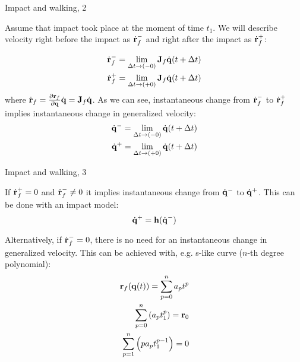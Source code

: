 \documentclass{beamer}
\begin{document}
\begin{frame}{Impact and walking, 2}
	\begin{flushleft}
		
		Assume that impact took place at the moment of time $t_1$. We will describe velocity right before the impact as $\dot{\mathbf{r}}_f^-$ and right after the impact as $\dot{\mathbf{r}}_f^+$:
		
		\begin{align}
			\dot{\mathbf{r}}_f^- = \lim_{\Delta t \to (-0)} \mathbf{J}_f \dot{\mathbf{q}}(t+\Delta t)
			\\
			\dot{\mathbf{r}}_f^+ = \lim_{\Delta t \to (+0)} \mathbf{J}_f \dot{\mathbf{q}}(t+\Delta t)
		\end{align}
		where $\dot{\mathbf{r}}_f  = \frac{\partial \mathbf{r}_f}{\partial \mathbf{q}} \dot{\mathbf{q}} = \mathbf{J}_f\dot{\mathbf{q}}$. As we can see, instantaneous change from $\dot{\mathbf{r}}_f^-$ to $\dot{\mathbf{r}}_f^+$ implies instantaneous change in generalized velocity:
		\begin{align}
			\dot{\mathbf{q}}^- = \lim_{\Delta t \to (-0)}  \dot{\mathbf{q}}(t+\Delta t)
			\\
			\dot{\mathbf{q}}^+ = \lim_{\Delta t \to (+0)} \dot{\mathbf{q}}(t+\Delta t)
		\end{align}
		
	\end{flushleft}
\end{frame}



\begin{frame}{Impact and walking, 3}
	\begin{flushleft}
		
		If $\dot{\mathbf{r}}_f^+ = 0$ and $\dot{\mathbf{r}}_f^- \neq 0$ it implies instantaneous change from $\dot{\mathbf{q}}^-$ to $\dot{\mathbf{q}}^+$. This can be done with an impact model:
		\begin{equation}
			\dot{\mathbf{q}}^+ = \mathbf{h}( \dot{\mathbf{q}}^-)
		\end{equation}
	
		Alternatively, if $\dot{\mathbf{r}}_f^- = 0$, there is no need for an instantaneous change in generalized velocity. This can be achieved with, e.g. s-like curve ($n$-th degree polynomial):
		\begin{align}
			\mathbf{r}_f(\mathbf{q}(t)) = \sum_{p=0}^{n} a_p t^p \\
			\sum_{p=0}^{n} \left( a_p t_1^p \right) = \mathbf{r}_0 \\
			\sum_{p=1}^{n} \left(p a_p t_1^{p-1} \right) = 0
		\end{align}
		
	\end{flushleft}
\end{frame}
\end{document}

